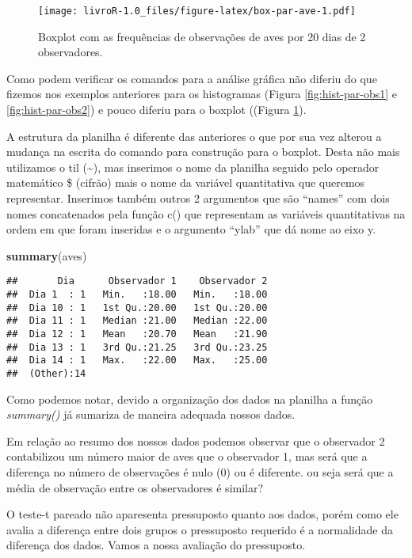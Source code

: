 \documentclass[titlepage, oneside, openany, a4paper]{book}
\newenvironment{Shaded}{\begin{snugshade}}{\end{snugshade}}
\newcommand{\KeywordTok}[1]{\textcolor[rgb]{0.13,0.29,0.53}{\textbf{#1}}}
\newcommand{\NormalTok}[1]{#1}
\begin{document}
\begin{figure}
\centering
\texttt{[image: livroR-1.0\_files/figure-latex/box-par-ave-1.pdf]}
\caption{\label{fig:box-par-ave}Boxplot com as frequências de observações de aves por 20 dias de 2 observadores.}
\end{figure}

Como podem verificar os comandos para a análise gráfica não diferiu do que fizemos nos exemplos anteriores para os histogramas (Figura \ref{fig:hist-par-obs1} e \ref{fig:hist-par-obs2}) e pouco diferiu para o boxplot ((Figura \ref{fig:box-par-ave}).

A estrutura da planilha é diferente das anteriores o que por sua vez alterou a mudança na escrita do comando para construção para o boxplot. Desta não mais utilizamos o til (\textasciitilde{}), mas inserimos o nome da planilha seguido pelo operador matemático \$ (cifrão) mais o nome da variável quantitativa que queremos representar. Inserimos também outros 2 argumentos que são ``names'' com dois nomes concatenados pela função c() que representam as variáveis quantitativas na ordem em que foram inseridas e o argumento ``ylab'' que dá nome ao eixo y.

\begin{Shaded}
\begin{Highlighting}[]
\KeywordTok{summary}\NormalTok{(aves)}
\end{Highlighting}
\end{Shaded}

\begin{verbatim}
##       Dia      Observador 1    Observador 2  
##  Dia 1  : 1   Min.   :18.00   Min.   :18.00  
##  Dia 10 : 1   1st Qu.:20.00   1st Qu.:20.00  
##  Dia 11 : 1   Median :21.00   Median :22.00  
##  Dia 12 : 1   Mean   :20.70   Mean   :21.90  
##  Dia 13 : 1   3rd Qu.:21.25   3rd Qu.:23.25  
##  Dia 14 : 1   Max.   :22.00   Max.   :25.00  
##  (Other):14
\end{verbatim}

Como podemos notar, devido a organização dos dados na planilha a função \emph{summary()} já sumariza de maneira adequada nossos dados.

Em relação ao resumo dos nossos dados podemos observar que o observador 2 contabilizou um número maior de aves que o observador 1, mas será que a diferença no número de observações é nulo (0) ou é diferente. ou seja será que a média de observação entre os observadores é similar?

O teste-t pareado não aparesenta pressuposto quanto aos dados, porém como ele avalia a diferença entre dois grupos o pressuposto requerido é a normalidade da diferença dos dados. Vamos a nossa avaliação do pressuposto.
\end{document}
